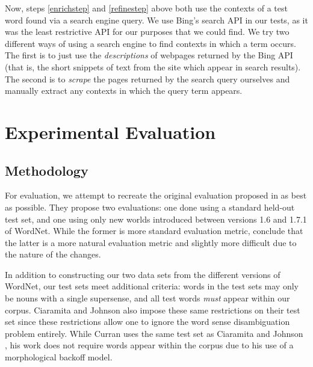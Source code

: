 \documentclass{article}
\begin{document}
Now, steps \ref{enrichstep} and \ref{refinestep} above both use the contexts of a test word found via a search engine query.
We use Bing's search API in our tests, as it was the least restrictive API for our purposes that we could find.
We try two different ways of using a search engine to find contexts in which a term occurs.
The first is to just use the {\it descriptions} of webpages returned by the Bing API (that is, the short snippets of text from the site which appear in search results).
The second is to {\it scrape} the pages returned by the search query ourselves and manually extract any contexts in which the query term appears.

\section{Experimental Evaluation}

\subsection{Methodology}


For evaluation, we attempt to recreate the original evaluation proposed in \cite{cj} as best as possible. 
They propose two evaluations: one done using a standard held-out test set, and one using only new worlds introduced between versions 1.6 and 1.7.1 of WordNet. 
While the former is more standard evaluation metric, \cite{cj} conclude that the latter is a more natural evaluation metric and slightly more difficult due to the nature of the changes.

In addition to constructing our two data sets from the different versions of WordNet, our test sets meet additional criteria: words in the test sets may only be nouns with a single supersense, and all test words \emph{must} appear within our corpus. 
Ciaramita and Johnson also impose these same restrictions on their test set \cite{cj} since these restrictions allow one to ignore the word sense disambiguation problem entirely.
While Curran uses the same test set as Ciaramita and Johnson \cite{curran}, his work does not require words appear within the corpus due to his use of a morphological backoff model.
\end{document}
